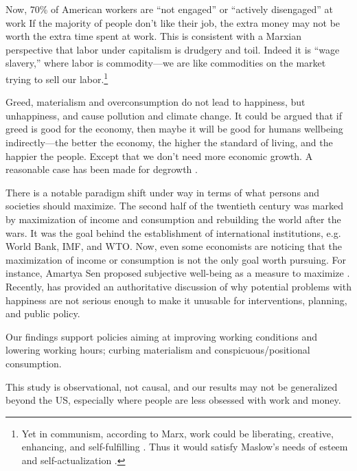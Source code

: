 \documentclass[10pt, letterpaper]{article}
\begin{document}
\begin{spacing}{1.8}
Now, 70\% of American workers are ``not engaged'' or ``actively disengaged'' at work \citep[][]{harvey14}
If the majority of people don't like their job, the extra money may not be worth
the extra time spent at work. This is consistent with a Marxian perspective that
labor under capitalism is drudgery and toil. Indeed it is ``wage slavery,''
where labor is commodity---we are like commodities on the market trying to sell
our labor.\footnote{Yet in communism, according to Marx, work could be
  liberating, creative, enhancing, and self-fulfilling \citep{spencer20}. Thus
  it would satisfy Maslow's needs of esteem and self-actualization \citep{maslow87}.} 

Greed, materialism and overconsumption do not lead to happiness, but unhappiness, and cause pollution and climate change\citep{leonard10,pachauri14}.
 It could be argued that if greed is good for the economy, then maybe it will be
 good for humans wellbeing indirectly---the better the economy, the higher the
 standard of living, and the happier the people. Except that we don't need more
 economic growth. A reasonable case has been made for degrowth \cite{kallis12,kallis11,bergh11}.
 
There is a notable paradigm shift under way in terms of what persons and
societies should maximize. The second half of the twentieth century was marked
by maximization of income and consumption and rebuilding the world after the
wars. It was the goal behind the establishment of international institutions,
e.g. World Bank, IMF, and WTO. Now, even some economists are noticing that the maximization of income or consumption is not the only goal worth pursuing. For instance, Amartya Sen proposed subjective well-being as a measure to maximize \cite{stiglitz09al}. 
Recently, \citet{diener09} has provided an authoritative  
discussion of why potential problems with happiness are not serious enough to make it unusable for interventions, planning, and public policy.  

Our findings support policies aiming at improving working conditions and lowering working hours; curbing materialism and conspicuous/positional consumption. 

This study is observational, not causal, and our results may not be generalized beyond the US, especially where people are less obsessed with work and money. 


\end{spacing}
\end{document}
